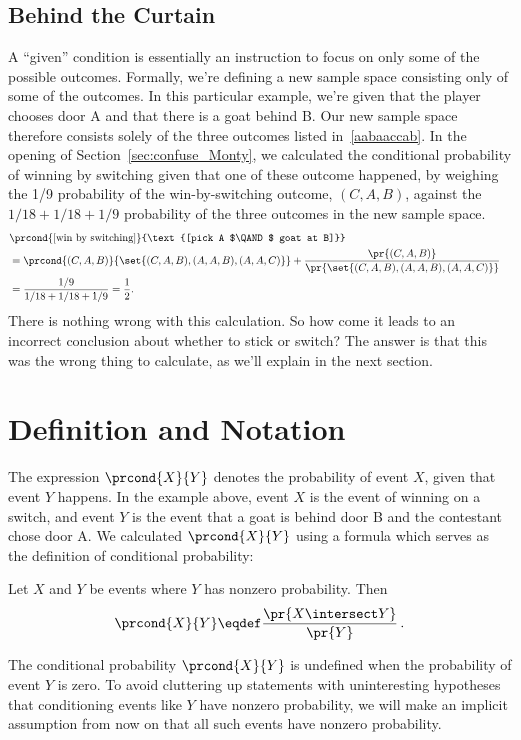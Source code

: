 \subsection{Behind the Curtain}

A ``given'' condition is essentially an instruction to focus on only
some of the possible outcomes.  Formally, we're defining a new sample
space consisting only of some of the outcomes.  In this particular
example, we're given that the player chooses door A and that there is
a goat behind B.  Our new sample space therefore consists solely of
the three outcomes listed in~\eqref{aabaaccab}.  In the opening of
Section~\ref{sec:confuse_Monty}, we calculated the conditional
probability of winning by switching given that one of these outcome
happened, by weighing the 1/9 probability of the win-by-switching
outcome, $(C, A, B)$, against the $1/18 + 1/18 + 1/9$ probability of
the three outcomes in the new sample space.
\begin{align*}
\lefteqn{\prcond{\text{[win by switching]}}{\text{[pick A $\QAND$ goat at B]}}}\\
  & = \prcond{(C, A, B)}{\set{(C, A, B),(A, A, B),(A, A, C)}}
       + \frac{\pr{(C, A, B)}}{\pr{\set{(C, A, B),(A, A, B),(A, A, C)}}}\\
  & = \frac{1/9}{1/18 + 1/18 + 1/9} = \frac{1}{2}.
\end{align*}
There is nothing wrong with this calculation.  So how come it leads to
an incorrect conclusion about whether to stick or switch?  The answer
is that this was the wrong thing to calculate, as we'll explain in the
next section.

\section{Definition and Notation}

The expression $\prcond{X}{Y}$ denotes the probability of event $X$,
given that event $Y$ happens.  In the example above, event $X$ is the
event of winning on a switch, and event $Y$ is the event that a goat
is behind door B and the contestant chose door A.  We calculated
$\prcond{X}{Y}$ using a formula which serves as the definition of
conditional probability:
\begin{definition}\label{LN12:prcond}
Let $X$ and $Y$ be events where $Y$ has nonzero probability.  Then
\[
\prcond{X}{Y} \eqdef \frac{\pr{X \intersect Y}}{\pr{Y}}\,.
\]
\end{definition}

The conditional probability $\prcond{X}{Y}$ is undefined when the
probability of event $Y$ is zero.  To avoid cluttering up statements
with uninteresting hypotheses that conditioning events like $Y$ have
nonzero probability, we will make an implicit assumption from now on
that all such events have nonzero probability.

